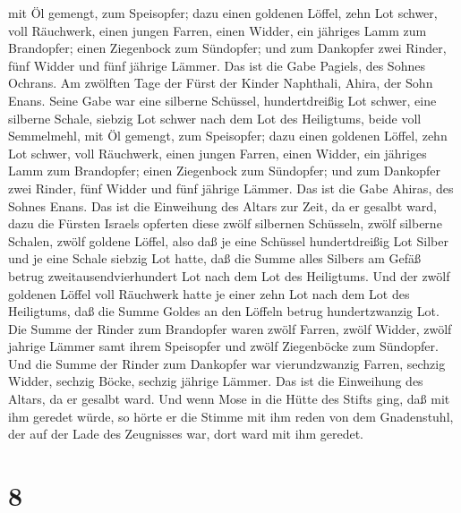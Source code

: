 mit Öl gemengt, zum Speisopfer;  dazu einen goldenen
Löffel, zehn Lot schwer, voll Räuchwerk,  einen jungen
Farren, einen Widder, ein jähriges Lamm zum Brandopfer; 
einen Ziegenbock zum Sündopfer;  und zum Dankopfer zwei
Rinder, fünf Widder und fünf jährige Lämmer. Das ist die Gabe Pagiels,
des Sohnes Ochrans.  Am zwölften Tage der Fürst der Kinder
Naphthali, Ahira, der Sohn Enans.  Seine Gabe war eine
silberne Schüssel, hundertdreißig Lot schwer, eine silberne Schale,
siebzig Lot schwer nach dem Lot des Heiligtums, beide voll Semmelmehl,
mit Öl gemengt, zum Speisopfer;  dazu einen goldenen
Löffel, zehn Lot schwer, voll Räuchwerk,  einen jungen
Farren, einen Widder, ein jähriges Lamm zum Brandopfer; 
einen Ziegenbock zum Sündopfer;  und zum Dankopfer zwei
Rinder, fünf Widder und fünf jährige Lämmer. Das ist die Gabe Ahiras,
des Sohnes Enans.  Das ist die Einweihung des Altars zur
Zeit, da er gesalbt ward, dazu die Fürsten Israels opferten diese zwölf
silbernen Schüsseln, zwölf silberne Schalen, zwölf goldene Löffel,
 also daß je eine Schüssel hundertdreißig Lot Silber und je
eine Schale siebzig Lot hatte, daß die Summe alles Silbers am Gefäß
betrug zweitausendvierhundert Lot nach dem Lot des Heiligtums.
 Und der zwölf goldenen Löffel voll Räuchwerk hatte je
einer zehn Lot nach dem Lot des Heiligtums, daß die Summe Goldes an den
Löffeln betrug hundertzwanzig Lot.  Die Summe der Rinder
zum Brandopfer waren zwölf Farren, zwölf Widder, zwölf jahrige Lämmer
samt ihrem Speisopfer und zwölf Ziegenböcke zum Sündopfer. 
Und die Summe der Rinder zum Dankopfer war vierundzwanzig Farren,
sechzig Widder, sechzig Böcke, sechzig jährige Lämmer. Das ist die
Einweihung des Altars, da er gesalbt ward.  Und wenn Mose
in die Hütte des Stifts ging, daß mit ihm geredet würde, so hörte er die
Stimme mit ihm reden von dem Gnadenstuhl, der auf der Lade des
Zeugnisses war, dort ward mit ihm geredet.

\hypertarget{section-7}{%
\section{8}\label{section-7}}

